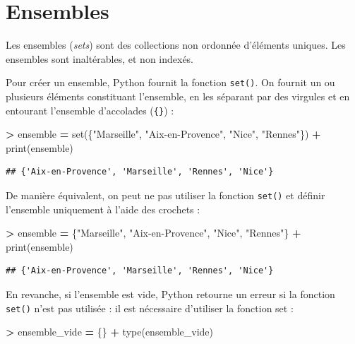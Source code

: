 \documentclass[12pt,]{book}
\newenvironment{Shaded}{\begin{snugshade}}{\end{snugshade}}
\newcommand{\StringTok}[1]{\textcolor[rgb]{0.31,0.60,0.02}{#1}}
\newcommand{\OperatorTok}[1]{\textcolor[rgb]{0.81,0.36,0.00}{\textbf{#1}}}
\newcommand{\BuiltInTok}[1]{#1}
\newcommand{\NormalTok}[1]{#1}
\numberwithin{equation}{section}
\numberwithin{countremarque}{section}
\begin{document}
\section{Ensembles}\label{structure-ensembles}

Les ensembles (\emph{sets}) sont des collections non ordonnée d'éléments
uniques. Les ensembles sont inaltérables, et non indexés.

Pour créer un ensemble, Python fournit la fonction \texttt{set()}. On
fournit un ou plusieurs éléments constituant l'ensemble, en les séparant
par des virgules et en entourant l'ensemble d'accolades (\texttt{\{\}})
:

\begin{Shaded}
\begin{Highlighting}[]
\OperatorTok{>}\NormalTok{ ensemble }\OperatorTok{=} \BuiltInTok{set}\NormalTok{(\{}\StringTok{"Marseille"}\NormalTok{, }\StringTok{"Aix-en-Provence"}\NormalTok{, }\StringTok{"Nice"}\NormalTok{, }\StringTok{"Rennes"}\NormalTok{\})}
\OperatorTok{+} \BuiltInTok{print}\NormalTok{(ensemble)}
\end{Highlighting}
\end{Shaded}

\begin{lstlisting}
## {'Aix-en-Provence', 'Marseille', 'Rennes', 'Nice'}
\end{lstlisting}

De manière équivalent, on peut ne pas utiliser la fonction
\texttt{set()} et définir l'ensemble uniquement à l'aide des crochets :

\begin{Shaded}
\begin{Highlighting}[]
\OperatorTok{>}\NormalTok{ ensemble }\OperatorTok{=}\NormalTok{ \{}\StringTok{"Marseille"}\NormalTok{, }\StringTok{"Aix-en-Provence"}\NormalTok{, }\StringTok{"Nice"}\NormalTok{, }\StringTok{"Rennes"}\NormalTok{\}}
\OperatorTok{+} \BuiltInTok{print}\NormalTok{(ensemble)}
\end{Highlighting}
\end{Shaded}

\begin{lstlisting}
## {'Aix-en-Provence', 'Marseille', 'Rennes', 'Nice'}
\end{lstlisting}

En revanche, si l'ensemble est vide, Python retourne un erreur si la
fonction \texttt{set()} n'est pas utilisée : il est nécessaire
d'utiliser la fonction set :

\begin{Shaded}
\begin{Highlighting}[]
\OperatorTok{>}\NormalTok{ ensemble_vide }\OperatorTok{=}\NormalTok{ \{\}}
\OperatorTok{+} \BuiltInTok{type}\NormalTok{(ensemble_vide)}
\end{Highlighting}
\end{Shaded}
\end{document}
